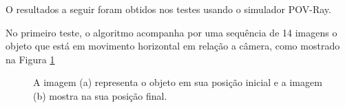 O resultados a seguir foram obtidos nos testes usando o simulador POV-Ray.

No primeiro teste, o algoritmo acompanha por uma sequência de 14 imagens 
o objeto que está em movimento horizontal em relação a câmera, como mostrado na Figura \ref{fig:imgpapercerta}

\begin{figure}[H]
\centering
  \caption{A imagem (a) representa o objeto em sua posição inicial  
   e a imagem (b) mostra na sua posição final.}
  \label{fig:imgpapercerta}
\end{figure}

